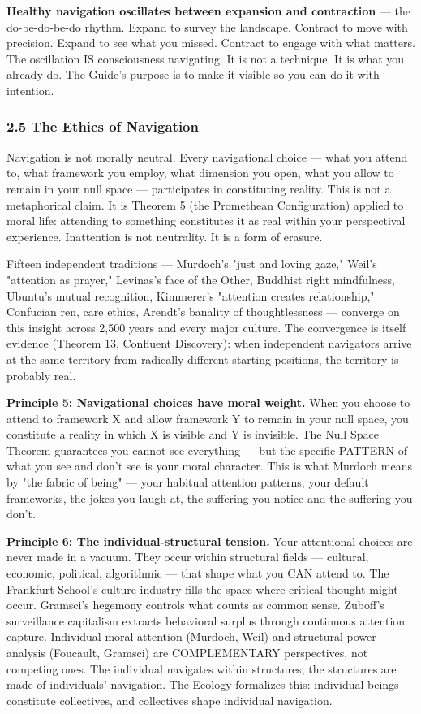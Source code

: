 \textbf{Healthy navigation oscillates between expansion and contraction} — the do-be-do-be-do rhythm. Expand to survey the landscape. Contract to move with precision. Expand to see what you missed. Contract to engage with what matters. The oscillation IS consciousness navigating. It is not a technique. It is what you already do. The Guide's purpose is to make it visible so you can do it with intention.


\subsubsection*{2.5 The Ethics of Navigation}


Navigation is not morally neutral. Every navigational choice — what you attend to, what framework you employ, what dimension you open, what you allow to remain in your null space — participates in constituting reality. This is not a metaphorical claim. It is Theorem 5 (the Promethean Configuration) applied to moral life: attending to something constitutes it as real within your perspectival experience. Inattention is not neutrality. It is a form of erasure.


Fifteen independent traditions — Murdoch's "just and loving gaze," Weil's "attention as prayer," Levinas's face of the Other, Buddhist right mindfulness, Ubuntu's mutual recognition, Kimmerer's "attention creates relationship," Confucian ren, care ethics, Arendt's banality of thoughtlessness — converge on this insight across 2,500 years and every major culture. The convergence is itself evidence (Theorem 13, Confluent Discovery): when independent navigators arrive at the same territory from radically different starting positions, the territory is probably real.


\textbf{Principle 5: Navigational choices have moral weight.} When you choose to attend to framework X and allow framework Y to remain in your null space, you constitute a reality in which X is visible and Y is invisible. The Null Space Theorem guarantees you cannot see everything — but the specific PATTERN of what you see and don't see is your moral character. This is what Murdoch means by "the fabric of being" — your habitual attention patterns, your default frameworks, the jokes you laugh at, the suffering you notice and the suffering you don't.


\textbf{Principle 6: The individual-structural tension.} Your attentional choices are never made in a vacuum. They occur within structural fields — cultural, economic, political, algorithmic — that shape what you CAN attend to. The Frankfurt School's culture industry fills the space where critical thought might occur. Gramsci's hegemony controls what counts as common sense. Zuboff's surveillance capitalism extracts behavioral surplus through continuous attention capture. Individual moral attention (Murdoch, Weil) and structural power analysis (Foucault, Gramsci) are COMPLEMENTARY perspectives, not competing ones. The individual navigates within structures; the structures are made of individuals' navigation. The Ecology formalizes this: individual beings constitute collectives, and collectives shape individual navigation.


